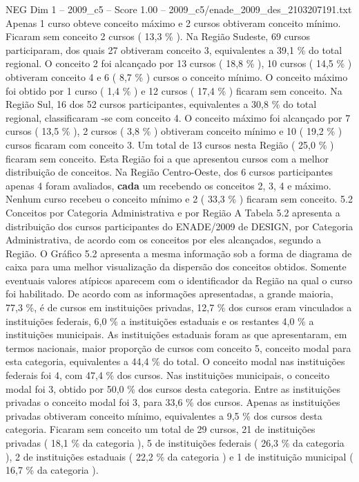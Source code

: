 \begin{textsample}{NEG Dim 1 – 2009\_c5 – Score 1.00 – 2009\_c5/enade\_2009\_des\_2103207191.txt}
Apenas 1 curso obteve conceito máximo e 2 cursos obtiveram conceito mínimo.
Ficaram sem conceito 2 cursos ( 13,3 \% ).
Na Região Sudeste, 69 cursos participaram, dos quais 27 obtiveram conceito 3, equivalentes a 39,1 \% do total regional.
O conceito 2 foi alcançado por 13 cursos ( 18,8 \% ), 10 cursos ( 14,5 \% ) obtiveram conceito 4 e 6 ( 8,7 \% ) cursos o conceito mínimo.
O conceito máximo foi obtido por 1 curso ( 1,4 \% ) e 12 cursos ( 17,4 \% ) ficaram sem conceito.
Na Região Sul, 16 dos 52 cursos participantes, equivalentes a 30,8 \% do total regional, classificaram -se com conceito 4.
O conceito máximo foi alcançado por 7 cursos ( 13,5 \% ), 2 cursos ( 3,8 \% ) obtiveram conceito mínimo e 10 ( 19,2 \% ) cursos ficaram com conceito 3.
Um total de 13 cursos nesta Região ( 25,0 \% ) ficaram sem conceito.
Esta Região foi a que apresentou cursos com a melhor distribuição de conceitos.
Na Região Centro-Oeste, dos 6 cursos participantes apenas 4 foram avaliados, \textbf{cada} um recebendo os conceitos 2, 3, 4 e máximo.
Nenhum curso recebeu o conceito mínimo e 2 ( 33,3 \% ) ficaram sem conceito. 5.2 Conceitos por Categoria Administrativa e por Região A Tabela 5.2 apresenta a distribuição dos cursos participantes do ENADE/2009 de DESIGN, por Categoria Administrativa, de acordo com os conceitos por eles alcançados, segundo a Região.
O Gráfico 5.2 apresenta a mesma informação sob a forma de diagrama de caixa para uma melhor visualização da dispersão dos conceitos obtidos.
Somente eventuais valores atípicos aparecem com o identificador da Região na qual o curso foi habilitado.
De acordo com as informações apresentadas, a grande maioria, 77,3 \%, é de cursos em instituições privadas, 12,7 \% dos cursos eram vinculados a instituições federais, 6,0 \% a instituições estaduais e os restantes 4,0 \% a instituições municipais.
As instituições estaduais foram as que apresentaram, em termos nacionais, maior proporção de cursos com conceito 5, conceito modal para esta categoria, equivalentes a 44,4 \% do total.
O conceito modal nas instituições federais foi 4, com 47,4 \% dos cursos.
Nas instituições municipais, o conceito modal foi 3, obtido por 50,0 \% dos cursos desta categoria.
Entre as instituições privadas o conceito modal foi 3, para 33,6 \% dos cursos.
Apenas as instituições privadas obtiveram conceito mínimo, equivalentes a 9,5 \% dos cursos desta categoria.
Ficaram sem conceito um total de 29 cursos, 21 de instituições privadas ( 18,1 \% da categoria ), 5 de instituições federais ( 26,3 \% da categoria ), 2 de instituições estaduais ( 22,2 \% da categoria ) e 1 de instituição municipal ( 16,7 \% da categoria ).

\end{textsample}
